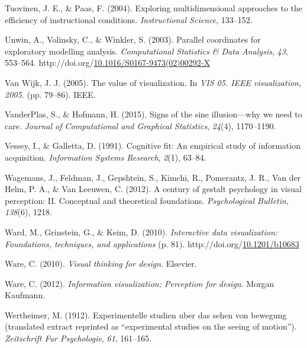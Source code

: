 \documentclass[print]{nuthesis}
\newlength{\cslhangindent}
\newenvironment{CSLReferences}[2]%
{\setlength{\parindent}{0pt}%
\everypar{\setlength{\hangindent}{\cslhangindent}}\ignorespaces}%
{\par}
\begin{document}
\begin{CSLReferences}{1}{0}
\leavevmode{}%
Tuovinen, J. E., \& Paas, F. (2004). Exploring multidimensional approaches to the efficiency of instructional conditions. \emph{Instructional Science}, 133--152.

\leavevmode{}%
Unwin, A., Volinsky, C., \& Winkler, S. (2003). Parallel coordinates for exploratory modelling analysis. \emph{Computational Statistics \& Data Analysis}, \emph{43}, 553--564. http://doi.org/\href{https://doi.org/10.1016/S0167-9473(02)00292-X}{10.1016/S0167-9473(02)00292-X}

\leavevmode{}%
Van Wijk, J. J. (2005). The value of visualization. In \emph{VIS 05. IEEE visualization, 2005.} (pp. 79--86). IEEE.

\leavevmode{}%
VanderPlas, S., \& Hofmann, H. (2015). Signs of the sine illusion---why we need to care. \emph{Journal of Computational and Graphical Statistics}, \emph{24}(4), 1170--1190.

\leavevmode{}%
Vessey, I., \& Galletta, D. (1991). Cognitive fit: An empirical study of information acquisition. \emph{Information Systems Research}, \emph{2}(1), 63--84.

\leavevmode{}%
Wagemans, J., Feldman, J., Gepshtein, S., Kimchi, R., Pomerantz, J. R., Van der Helm, P. A., \& Van Leeuwen, C. (2012). A century of gestalt psychology in visual perception: II. Conceptual and theoretical foundations. \emph{Psychological Bulletin}, \emph{138}(6), 1218.

\leavevmode{}%
Ward, M., Grinstein, G., \& Keim, D. (2010). \emph{Interactive data visualization: Foundations, techniques, and applications} (p. 81). http://doi.org/\href{https://doi.org/10.1201/b10683}{10.1201/b10683}

\leavevmode{}%
Ware, C. (2010). \emph{Visual thinking for design}. Elsevier.

\leavevmode{}%
Ware, C. (2012). \emph{Information visualization: Perception for design}. Morgan Kaufmann.

\leavevmode{}%
Wertheimer, M. (1912). Experimentelle studien uber das sehen von bewegung (translated extract reprinted as {``experimental studies on the seeing of motion''}). \emph{Zeitschrift Fur Psychologie}, \emph{61}, 161--165.


\end{CSLReferences}
\end{document}
